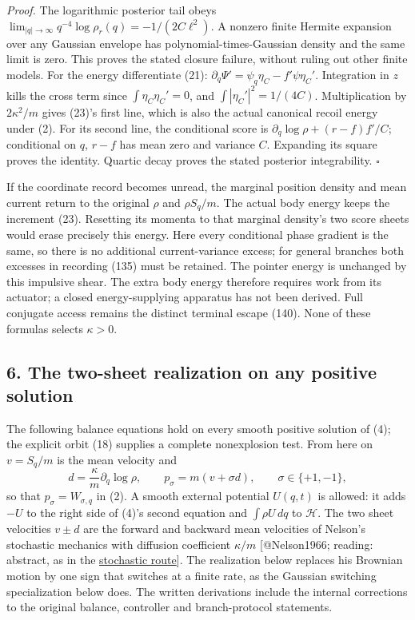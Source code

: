 \documentclass[11pt,a4paper]{article}
\begin{document}
\emph{Proof.} The logarithmic posterior tail obeys
\(\lim_{|q|\to\infty}q^{-4}\log\rho_r(q) =-1/(2C\ell^2)\). A nonzero
finite Hermite expansion over any Gaussian envelope has
polynomial-times-Gaussian density and the same limit is zero. This
proves the stated closure failure, without ruling out other finite
models. For the energy differentiate (21):
\(\partial_q\Psi'=\psi_q\eta_C-f'\psi\eta_C'\). Integration in \(z\)
kills the cross term since \(\int\eta_C\eta_C'=0\), and
\(\int|\eta_C'|^2=1/(4C)\). Multiplication by \(2\kappa^2/m\) gives
(23)'s first line, which is also the actual canonical recoil energy
under (2). For its second line, the conditional score is
\(\partial_q\log\rho+(r-f)f'/C\); conditional on \(q\), \(r-f\) has mean
zero and variance \(C\). Expanding its square proves the identity.
Quartic decay proves the stated posterior integrability. \(\square\)

If the coordinate record becomes unread, the marginal position density
and mean current return to the original \(\rho\) and \(\rho S_q/m\). The
actual body energy keeps the increment (23). Resetting its momenta to
that marginal density's two score sheets would erase precisely this
energy. Here every conditional phase gradient is the same, so there is
no additional current-variance excess; for general branches both
excesses in recording (135) must be retained. The pointer energy is
unchanged by this impulsive shear. The extra body energy therefore
requires work from its actuator; a closed energy-supplying apparatus has
not been derived. Full conjugate access remains the distinct terminal
escape (140). None of these formulas selects \(\kappa>0\).

\hypertarget{the-two-sheet-realization-on-any-positive-solution}{%
\subsection{6. The two-sheet realization on any positive
solution}\label{the-two-sheet-realization-on-any-positive-solution}}

The following balance equations hold on every smooth positive solution
of (4); the explicit orbit (18) supplies a complete nonexplosion test.
From here on \(v=S_q/m\) is the mean velocity and
\[d=\frac{\kappa}{m}\partial_q\log\rho,\qquad
p_\sigma=m(v+\sigma d),\qquad\sigma\in\{+1,-1\},\tag{24}\] so that
\(p_\sigma=W_{\sigma,q}\) in (2). A smooth external potential \(U(q,t)\)
is allowed: it adds \(-U\) to the right side of (4)'s second equation
and \(\int\rho U\,dq\) to \(\mathcal H\). The two sheet velocities
\(v\pm d\) are the forward and backward mean velocities of Nelson's
stochastic mechanics with diffusion coefficient \(\kappa/m\)
{[}@Nelson1966; reading: abstract, as in the
\href{composition-universality.md\#continuous-free-paths-and-ultimate-velocity}{stochastic
route}{]}. The realization below replaces his Brownian motion by one
sign that switches at a finite rate, as the Gaussian switching
specialization below does. The written derivations include the internal
corrections to the original balance, controller and branch-protocol
statements.
\end{document}
